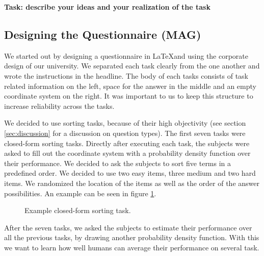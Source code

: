 \documentclass[../main/main.tex]{subfiles}
\begin{document}
	
	\textbf{Task: describe your ideas and your realization of the task}
	
	\subsection{Designing the Questionnaire (MAG)}
	
	We started out by designing a questionnaire in \LaTeX and using the corporate design of our university. We separated each task clearly from the one another and wrote the instructions in the headline. The body of each tasks consists of task related information on the left, space for the answer in the middle and an empty coordinate system on the right. It was important to us to keep this structure to increase reliability across the tasks.
	
	We decided to use sorting tasks, because of their high objectivity (see section \ref{sec:discussion} for a discussion on question types). The first seven tasks were closed-form sorting tasks. Directly after executing each task, the subjects were asked to fill out the coordinate system with a probability density function over their performance. We decided to ask the subjects to sort five terms in a predefined order. We decided to use two easy items, three medium and two hard items. We randomized the location of the items as well as the order of the answer possibilities. An example can be seen in figure \ref{fig:example-task}.
	
	\begin{figure}[h]
		\label{fig:example-task}
		\centering
		\captionsetup{justification=centering}
		\caption{Example closed-form sorting task.}
	\end{figure} 
	
	After the seven tasks, we asked the subjects to estimate their performance over all the previous tasks, by drawing another probability density function. With this we want to learn how well humans can average their performance on several task. 
		
\end{document}
